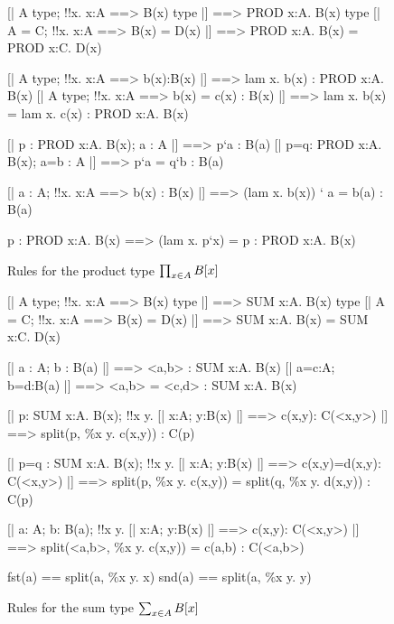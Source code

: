 \begin{figure} 
\begin{ttbox}
     [| A type; !!x. x:A ==> B(x) type |] ==> PROD x:A. B(x) type
    [| A = C;  !!x. x:A ==> B(x) = D(x) |] ==> 
          PROD x:A. B(x) = PROD x:C. D(x)

     [| A type;  !!x. x:A ==> b(x):B(x)
          |] ==> lam x. b(x) : PROD x:A. B(x)
    [| A type;  !!x. x:A ==> b(x) = c(x) : B(x)
          |] ==> lam x. b(x) = lam x. c(x) : PROD x:A. B(x)

     [| p : PROD x:A. B(x);  a : A |] ==> p`a : B(a)
    [| p=q: PROD x:A. B(x);  a=b : A |] ==> p`a = q`b : B(a)

     [| a : A;  !!x. x:A ==> b(x) : B(x)
          |] ==> (lam x. b(x)) ` a = b(a) : B(a)

    p : PROD x:A. B(x) ==> (lam x. p`x) = p : PROD x:A. B(x)
\end{ttbox}
\caption{Rules for the product type $\prod\sb{x\in A}B[x]$} \label{ctt-prod}
\end{figure}


\begin{figure} 
\begin{ttbox}
      [| A type;  !!x. x:A ==> B(x) type |] ==> SUM x:A. B(x) type
     [| A = C;  !!x. x:A ==> B(x) = D(x) 
          |] ==> SUM x:A. B(x) = SUM x:C. D(x)

      [| a : A;  b : B(a) |] ==> <a,b> : SUM x:A. B(x)
     [| a=c:A;  b=d:B(a) |] ==> <a,b> = <c,d> : SUM x:A. B(x)

      [| p: SUM x:A. B(x);  
             !!x y. [| x:A; y:B(x) |] ==> c(x,y): C(<x,y>) 
          |] ==> split(p, \%x y. c(x,y)) : C(p)

     [| p=q : SUM x:A. B(x); 
             !!x y. [| x:A; y:B(x) |] ==> c(x,y)=d(x,y): C(<x,y>)
          |] ==> split(p, \%x y. c(x,y)) = split(q, \%x y. d(x,y)) : C(p)

      [| a: A;  b: B(a);
             !!x y. [| x:A; y:B(x) |] ==> c(x,y): C(<x,y>)
          |] ==> split(<a,b>, \%x y. c(x,y)) = c(a,b) : C(<a,b>)

   fst(a) == split(a, \%x y. x)
   snd(a) == split(a, \%x y. y)
\end{ttbox}
\caption{Rules for the sum type $\sum\sb{x\in A}B[x]$} \label{ctt-sum}
\end{figure}


